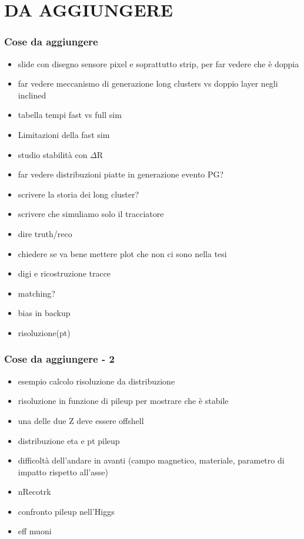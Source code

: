 \documentclass{beamer}
\begin{document}

\section{DA AGGIUNGERE}
\begin{frame}
\frametitle{Cose da aggiungere}
\begin{itemize}
\item slide con disegno sensore pixel e soprattutto strip, per far vedere che \`e doppia
\item far vedere meccanismo di generazione long clusters vs doppio layer negli inclined
\item tabella tempi fast vs full sim
\item Limitazioni della fast sim
\item studio stabilit\`a con $\Delta$R
\item far vedere distribuzioni piatte in generazione evento PG?
\item scrivere la storia dei long cluster?
\item scrivere che simuliamo solo il tracciatore
\item dire truth/reco
\item chiedere se va bene mettere plot che non ci sono nella tesi
\item digi e ricostruzione tracce
\item matching?
\item bias in backup
\item risoluzione(pt)
\end{itemize}
\end{frame}

\begin{frame}
\frametitle{Cose da aggiungere - 2}
\begin{itemize}
\item esempio calcolo risoluzione da distribuzione
\item risoluzione in funzione di pileup per mostrare che \`e stabile
\item una delle due Z deve essere offshell
\item distribuzione eta e pt pileup
\item difficolt\`a dell'andare in avanti (campo magnetico, materiale, parametro di impatto rispetto all'asse)
\item nRecotrk
\item confronto pileup nell'Higgs
\item eff muoni
\end{itemize}
\end{frame}
\end{document}
